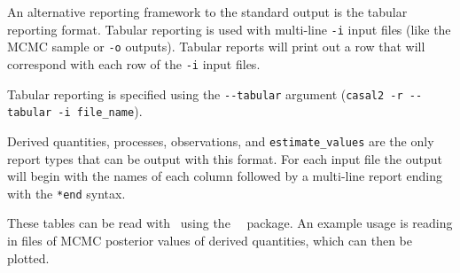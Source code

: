 An alternative reporting framework to the standard output is the tabular reporting format. Tabular reporting is used with multi-line \texttt{-i} input files (like the MCMC sample or \texttt{-o} outputs). Tabular reports will print out a row that will correspond with each row of the \texttt{-i} input files.

Tabular reporting is specified using the \texttt{-{}-tabular} argument (\texttt{casal2 -r -{}-tabular -i file\_name}).

Derived quantities, processes, observations, and \texttt{estimate\_values} are the only report types that can be output with this format. For each input file the output will begin with the names of each column followed by a multi-line report ending with the \texttt{*end} syntax.

These tables can be read with \R\ using the \CNAME\ \R\ package. An example usage is reading in files of MCMC posterior values of derived quantities, which can then be plotted.


